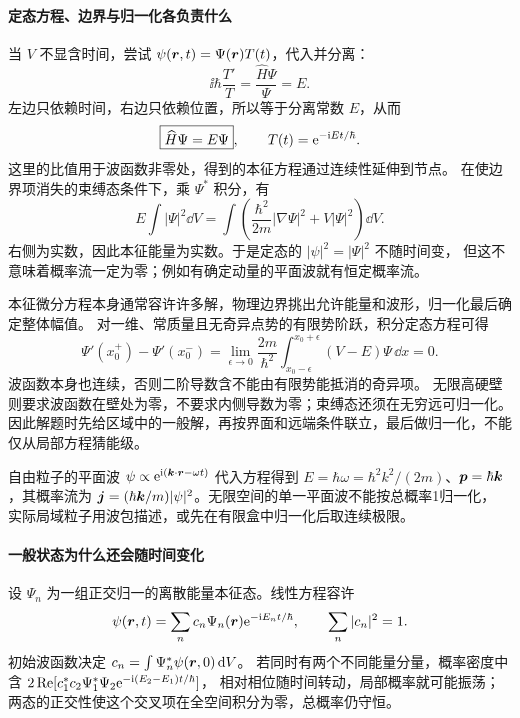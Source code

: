 \paragraph{定态方程、边界与归一化各负责什么}
当 $V$ 不显含时间，尝试 $\psi(\bm{r},t)=\Psi(\bm{r})T(t)$，代入并分离：
\[
 \ii\hbar\frac{T'}T=\frac{\widehat H\Psi}{\Psi}=E.
\]
左边只依赖时间，右边只依赖位置，所以等于分离常数 $E$，从而
\[
 \boxed{\widehat H\Psi=E\Psi},\qquad
 T(t)=\mathrm e^{-\mathrm i Et/\hbar}.
\]
这里的比值用于波函数非零处，得到的本征方程通过连续性延伸到节点。
在使边界项消失的束缚态条件下，乘 $\Psi^*$ 积分，有
\[
 E\int|\Psi|^2\dd V
 =\int\left(\frac{\hbar^2}{2m}|\nabla\Psi|^2+V|\Psi|^2\right)\dd V.
\]
右侧为实数，因此本征能量为实数。于是定态的 $|\psi|^2=|\Psi|^2$ 不随时间变，
但这不意味着概率流一定为零；例如有确定动量的平面波就有恒定概率流。

本征微分方程本身通常容许许多解，物理边界挑出允许能量和波形，归一化最后确定整体幅值。
对一维、常质量且无奇异点势的有限势阶跃，积分定态方程可得
\[
 \Psi'(x_0^+)-\Psi'(x_0^-)
 =\lim_{\epsilon\to0}\frac{2m}{\hbar^2}
 \int_{x_0-\epsilon}^{x_0+\epsilon}(V-E)\Psi\,\dd x=0.
\]
波函数本身也连续，否则二阶导数含不能由有限势能抵消的奇异项。
无限高硬壁则要求波函数在壁处为零，不要求内侧导数为零；束缚态还须在无穷远可归一化。
因此解题时先给区域中的一般解，再按界面和远端条件联立，最后做归一化，不能仅从局部方程猜能级。

自由粒子的平面波 $\psi\propto\mathrm e^{\mathrm i(\bm{k}\cdot\bm{r}-\omega t)}$ 代入方程得到
$E=\hbar\omega=\hbar^2k^2/(2m)$、$\bm{p}=\hbar\bm{k}$，其概率流为
$\bm{j}=(\hbar\bm{k}/m)|\psi|^2$。无限空间的单一平面波不能按总概率1归一化，
实际局域粒子用波包描述，或先在有限盒中归一化后取连续极限。

\paragraph{一般状态为什么还会随时间变化}
设 $\Psi_n$ 为一组正交归一的离散能量本征态。线性方程容许
\[
 \psi(\bm{r},t)=\sum_n c_n\Psi_n(\bm{r})\mathrm e^{-\mathrm i E_nt/\hbar},
 \qquad \sum_n|c_n|^2=1.
\]
初始波函数决定 $c_n=\int\Psi_n^*\psi(\bm{r},0)\mathop{}\!\mathrm d V$。
若同时有两个不同能量分量，概率密度中含
$2\operatorname{Re}[c_1^*c_2\Psi_1^*\Psi_2\mathrm e^{-\mathrm i(E_2-E_1)t/\hbar}]$，
相对相位随时间转动，局部概率就可能振荡；两态的正交性使这个交叉项在全空间积分为零，总概率仍守恒。

